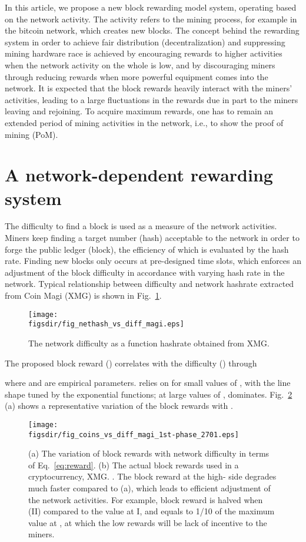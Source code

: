 \documentclass[aps,prl,reprint,showpacs,groupedaddress,letterpaper]{revtex4-1}
\def\figsdir{.}
\def\figwidth{3.in}
\newcommand{\pom}{PoM}
\begin{document}
In this article, we propose a new block rewarding model system, operating based on the network activity. The activity refers to the mining process, for example in the bitcoin network, which creates new blocks. The concept behind the rewarding system in order to achieve fair distribution (decentralization) and suppressing mining hardware race is achieved by encouraging rewards to higher activities when the network activity on the whole is low, and by discouraging miners through reducing rewards when more powerful equipment comes into the network. It is expected that the block rewards heavily interact with the miners' activities, leading to a large fluctuations in the rewards due in part to the miners leaving and rejoining. To acquire maximum rewards, one has to remain an extended period of mining activities in the network, i.e., to show the proof of mining (\pom). 

\section{A network-dependent rewarding system}

The difficulty to find a block is used as a measure of the network activities. Miners keep finding a target number (hash) acceptable to the network in order to forge the public ledger (block), the efficiency of which is evaluated by the hash rate. Finding new blocks only occurs at pre-designed time slots, which enforces an adjustment of the block difficulty in accordance with varying hash rate in the network. Typical relationship between difficulty and network hashrate extracted from Coin Magi (XMG) \cite{Magi.url} is shown in Fig.~\ref{fig:xmg.nethash}. 

\begin{figure}[!h]
\texttt{[image: \\figsdir/fig\_nethash\_vs\_diff\_magi.eps]}
\caption{\label{fig:xmg.nethash} The network difficulty as a function hashrate obtained from XMG. \cite{Magi.url}
}
\end{figure}

The proposed block reward () correlates with the difficulty () through

where  and  are empirical parameters.  relies on  for small values of , with the line shape tuned by the exponential functions; at large values of ,  dominates. Fig.~\ref{fig:rewards} (a) shows a representative variation of the block rewards with . 

\begin{figure}[!h]
\texttt{[image: \\figsdir/fig\_coins\_vs\_diff\_magi\_1st-phase\_2701.eps]}
\caption{\label{fig:rewards} (a) The variation of block rewards with network difficulty in terms of Eq.~\ref{eq:reward}. (b) The actual block rewards used in a cryptocurrency, XMG. \cite{Magi.url}. The block reward at the high- side degrades much faster compared to (a), which leads to efficient adjustment of the network activities. For example, block reward is halved when  (II) compared to the value at I, and equals to 1/10 of the maximum value at , at which the low rewards will be lack of incentive to the miners. }
\end{figure}
\end{document}
